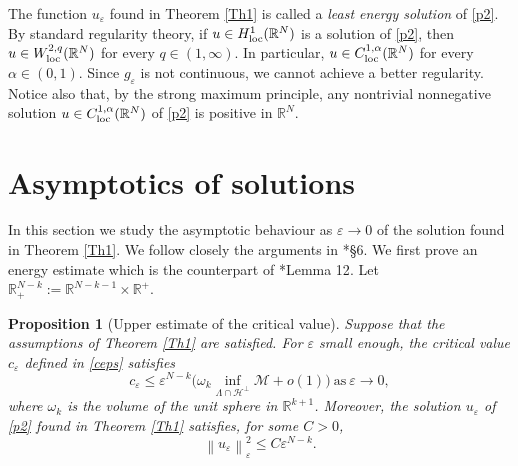 \documentclass[a4paper]{amsart}
\newtheorem{proposition}{Proposition}[section]
\begin{document}
The function $u_{\varepsilon}$ found in Theorem \ref{Th1} is called a \textit{least energy solution} of \eqref{p2}. By
standard regularity theory, if $u \in H^1_{\textnormal{loc}}({\mathbb{R}}^N)$ is a solution of \eqref{p2}, then $u \in
W^{2,q}_{\textnormal{loc}}({\mathbb{R}}^N)$ for every $q \in (1,\infty)$. In particular, $u \in C^{1,\alpha}_{\textnormal{loc}}({\mathbb{R}}^N)$ for
every $\alpha \in (0,1)$. Since $g_{\varepsilon}$ is not continuous, we cannot achieve a better regularity. Notice also
that, by the strong maximum principle, any nontrivial nonnegative solution $u \in C^{1,\alpha}_{\textnormal{loc}}({\mathbb{R}}^N)$ of
\eqref{p2} is positive in ${\mathbb{R}}^N$.

\section{Asymptotics of solutions}\label{sec:Asympt}

In this section we study the asymptotic behaviour as $\varepsilon \to 0$ of the solution found in Theorem \ref{Th1}. We
follow closely the arguments in \cite{BVS}*{\S 6}. We first prove an energy estimate which is the counterpart of \cite{BVS}*{Lemma
12}. Let ${\mathbb{R}}^{N-k}_+ := {\mathbb{R}}^{N-k-1} \times {\mathbb{R}}^+$.

\begin{proposition}[Upper estimate of the critical value]\label{estim:inf}
 Suppose that the assumptions of Theorem \ref{Th1} are satisfied. For $\varepsilon$ small enough, the critical value
$c_{\varepsilon}$ defined in \eqref{ceps} satisfies
 \[\label{estimc}
 c_{\varepsilon} \leq \varepsilon^{N-k} \bigl( \omega_k \inf_{\Lambda \cap \mathcal{H}^\perp} \mathcal{M} + o(1) \bigr)\ \text{as}\ \varepsilon \rightarrow 0,
 \]
where $\omega_k$ is the volume of the unit sphere in ${\mathbb{R}}^{k+1}$.
 Moreover, the solution $u_{\varepsilon}$ of \eqref{p2} found in Theorem \ref{Th1} satisfies, for some $C>0$,
\[
 {\left\| {u_{\varepsilon}} \right\|}_{\varepsilon}^2 \leq C\varepsilon^{N-k}.
\]
\end{proposition}
\end{document}
